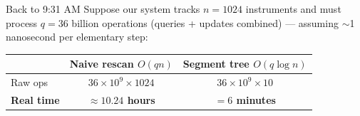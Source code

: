 \documentclass[10pt,aspectratio=169]{beamer}
\begin{document}
\begin{frame}{Back to 9:31 AM}
\vspace{-0.1cm}
\centering
\small
Suppose our system tracks $n = 1024$ instruments and must process $q = 36$ billion operations (queries + updates combined) --- assuming $\sim$1 nanosecond per elementary step:
\vspace{0.25cm}

\begin{center}
\renewcommand{\arraystretch}{1.35}
\begin{tabular}{@{}lcc@{}}
\toprule
 & \textbf{Naive rescan} $O(qn)$ & \textbf{Segment tree} $O(q\log n)$ \\
\midrule
Raw ops & $36\times10^9 \times 1024$ & $36\times10^9 \times 10$ \\
\rowcolor{lightblue!30}
\textbf{Real time} & \textbf{$\approx 10.24$ hours} & \textbf{$= 6$ minutes} \\
\bottomrule
\end{tabular}
\end{center}
\vspace{0.35cm}

\end{frame}
\end{document}
